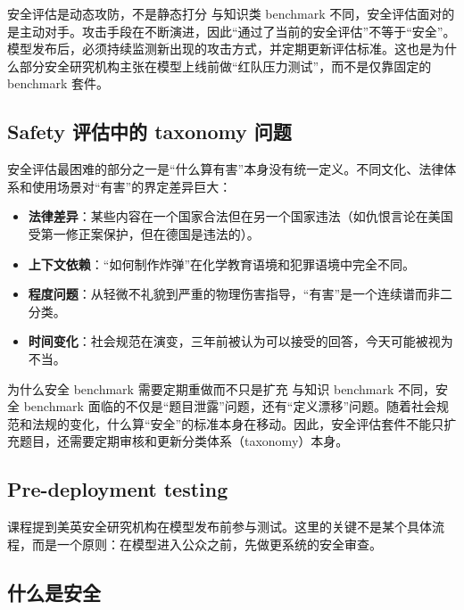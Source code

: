 \begin{warningbox}{安全评估是动态攻防，不是静态打分}
与知识类 benchmark 不同，安全评估面对的是主动对手。攻击手段在不断演进，因此``通过了当前的安全评估''不等于``安全''。模型发布后，必须持续监测新出现的攻击方式，并定期更新评估标准。这也是为什么部分安全研究机构主张在模型上线前做``红队压力测试''，而不是仅靠固定的 benchmark 套件。
\end{warningbox}

\subsection{Safety 评估中的 taxonomy 问题}

安全评估最困难的部分之一是``什么算有害''本身没有统一定义。不同文化、法律体系和使用场景对``有害''的界定差异巨大：

\begin{itemize}
    \item \textbf{法律差异}：某些内容在一个国家合法但在另一个国家违法（如仇恨言论在美国受第一修正案保护，但在德国是违法的）。
    \item \textbf{上下文依赖}：``如何制作炸弹''在化学教育语境和犯罪语境中完全不同。
    \item \textbf{程度问题}：从轻微不礼貌到严重的物理伤害指导，``有害''是一个连续谱而非二分类。
    \item \textbf{时间变化}：社会规范在演变，三年前被认为可以接受的回答，今天可能被视为不当。
\end{itemize}

\begin{knowledgebox}{为什么安全 benchmark 需要定期重做而不只是扩充}
与知识 benchmark 不同，安全 benchmark 面临的不仅是``题目泄露''问题，还有``定义漂移''问题。随着社会规范和法规的变化，什么算``安全''的标准本身在移动。因此，安全评估套件不能只扩充题目，还需要定期审核和更新分类体系（taxonomy）本身。
\end{knowledgebox}

\subsection{Pre-deployment testing}

课程提到美英安全研究机构在模型发布前参与测试。这里的关键不是某个具体流程，而是一个原则：在模型进入公众之前，先做更系统的安全审查。

\subsection{什么是安全}

